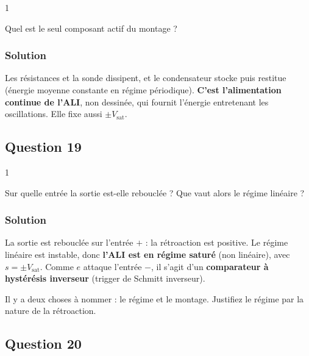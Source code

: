 \documentclass[11pt,a4paper]{article}
\begin{document}
\begin{indication}{1}

Quel est le seul composant actif du montage ?

\end{indication}

\hypertarget{solution-17}{%
\subsubsection{Solution}\label{solution-17}}

Les résistances et la sonde dissipent, et le condensateur stocke puis restitue (énergie moyenne constante en régime périodique). \textbf{C'est l'alimentation continue de l'ALI}, non dessinée, qui fournit l'énergie entretenant les oscillations. Elle fixe aussi \(\pm V_{\text{sat}}\).

\hypertarget{question-19}{%
\subsection{Question 19}\label{question-19}}

\begin{indication}{1}

Sur quelle entrée la sortie est-elle rebouclée ? Que vaut alors le régime linéaire ?

\end{indication}

\hypertarget{solution-18}{%
\subsubsection{Solution}\label{solution-18}}

La sortie est rebouclée sur l'entrée \(+\) : la rétroaction est positive. Le régime linéaire est instable, donc \textbf{l'ALI est en régime saturé} (non linéaire), avec \(s=\pm V_{\text{sat}}\). Comme \(e\) attaque l'entrée \(-\), il s'agit d'un \textbf{comparateur à hystérésis inverseur} (trigger de Schmitt inverseur).

\begin{jury}

Il y a deux choses à nommer : le régime et le montage. Justifiez le régime par la nature de la rétroaction.

\end{jury}

\hypertarget{question-20}{%
\subsection{Question 20}\label{question-20}}
\end{document}
